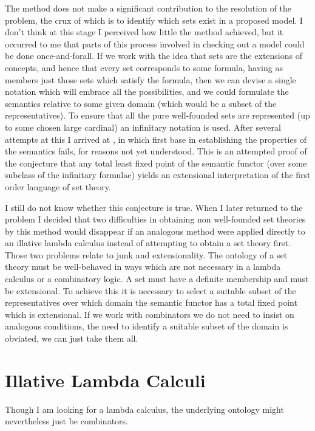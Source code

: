 \documentclass[numreferences]{rbjk}
\begin{document}
\begin{article}
The method does not make a significant contribution to the resolution of the problem, the crux of which is to identify which sets exist in a proposed model.
I don't think at this stage I perceived how little the method achieved, but it occurred to me that parts of this process involved in checking out a model could be done once-and-forall.
If we work with the idea that sets are the extensions of concepts, and hence that every set corresponds to some formula, having as members just those sets which satisfy the formula, then we can devise a single notation which will embrace all the possibilities, and we could formulate the semantics relative to some given domain (which would be a subset of the representatives).
To ensure that all the pure well-founded sets are represented (up to some chosen large cardinal) an infinitary notation is used.
After several attempts at this I arrived at \cite{rbjt026}, in which first base in establishing the properties of the semantics fails, for reasons not yet understood.
This is an attempted proof of the conjecture that any total least fixed point of the semantic functor (over some subclass of the infinitary formulae) yields an extensional interpretation of the first order language of set theory.

I still do not know whether this conjecture is true.
When I later returned to the problem I decided that two difficulties in obtaining non well-founded set theories by this method would disappear if an analogous method were applied directly to an illative lambda calculus instead of attempting to obtain a set theory first.
Those two problems relate to junk and extensionality.
The ontology of a set theory must be well-behaved in ways which are not necessary in a lambda calculus or a combinatory logic.
A set must have a definite membership and must be extensional.
To achieve this it is necessary to select a suitable subset of the representatives over which domain the semantic functor has a total fixed point which is extensional.
If we work with combinators we do not need to insist on analogous conditions, the need to identify a suitable subset of the domain is obviated, we can just take them all.

\section{Illative Lambda Calculi}

Though I am looking for a lambda calculus, the underlying ontology might nevertheless just be combinators.

{\raggedright


} %


\end{article}
\end{document}
